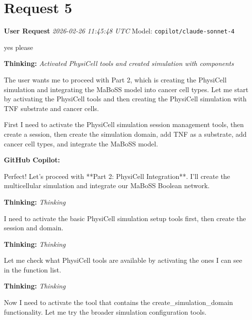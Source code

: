 \documentclass[11pt,a4paper]{article}
\begin{document}
\section{Request 5}
\begin{userbox}
\textbf{User Request}
\quad \textit{2026-02-26 11:45:48 UTC}
\quad Model: \texttt{copilot/claude-sonnet-4}

yes please

\end{userbox}
\begin{thinkbox}
\textbf{Thinking:} \textit{Activated PhysiCell tools and created simulation with components}

The user wants me to proceed with Part 2, which is creating the PhysiCell simulation and integrating the MaBoSS model into cancer cell types. Let me start by activating the PhysiCell tools and then creating the PhysiCell simulation with TNF substrate and cancer cells.

First I need to activate the PhysiCell simulation session management tools, then create a session, then create the simulation domain, add TNF as a substrate, add cancer cell types, and integrate the MaBoSS model.

\end{thinkbox}
\begin{copilotbox}
\textbf{GitHub Copilot:}

Perfect! Let's proceed with **Part 2: PhysiCell Integration**. I'll create the multicellular simulation and integrate our MaBoSS Boolean network.

\end{copilotbox}
\begin{thinkbox}
\textbf{Thinking:} \textit{Thinking}

I need to activate the basic PhysiCell simulation setup tools first, then create the session and domain.

\end{thinkbox}
\begin{thinkbox}
\textbf{Thinking:} \textit{Thinking}

Let me check what PhysiCell tools are available by activating the ones I can see in the function list.

\end{thinkbox}
\begin{thinkbox}
\textbf{Thinking:} \textit{Thinking}

Now I need to activate the tool that contains the create\_simulation\_domain functionality. Let me try the broader simulation configuration tools.

\end{thinkbox}
\end{document}
